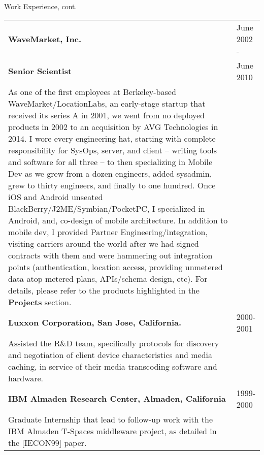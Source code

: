 \newpage
\begin{bf} \large
Work Experience, cont.
\end{bf}
\medskip

\begin{tabular}{p{5.2in}@{\hspace{1.5cm}}l}
	  
	\bf  WaveMarket, Inc.    & June 2002 -  \\
	\bf  Senior Scientist 	& June 2010 \\[4pt]
	
	   As one of the first employees at Berkeley-based WaveMarket/LocationLabs,
	   an early-stage startup that received its series A in 2001, 
	   we went from no deployed products in 2002 to an
	   acquisition by AVG Technologies in 2014.  I wore every engineering hat, starting with complete responsibility
	   for SysOps, server, and client -- writing tools and software for all three -- to
	   then specializing in Mobile Dev as we grew from a dozen engineers, added sysadmin, grew 
	   to thirty engineers, and finally to one hundred.  
	   Once iOS and Android unseated BlackBerry/J2ME/Symbian/PocketPC,
	   I specialized in Android, and, co-design of mobile architecture.  In addition to mobile dev, I provided
	   Partner Engineering/integration, visiting carriers around the world after we had signed contracts
	   with them and were hammering out integration points (authentication, location access, 
	   providing unmetered data atop metered plans, APIs/schema design, etc).
	   For details, please refer to the products highlighted in the {\bf Projects} section. \\[9pt]
       	  
    \bf Luxxon Corporation, San Jose, California. & 2000-2001 \\[3pt]
       Assisted the R\&D team, specifically
       protocols for discovery and negotiation of client
       device characteristics and media caching, in service of their media transcoding
       software and hardware. \\[9pt]

    \bf IBM Almaden Research Center, 
          Almaden, California                         & 1999-2000 \\[3pt]
       Graduate Internship that lead to follow-up work with
       the IBM Almaden T-Spaces middleware project, as detailed in the [IECON99] paper. \\[9pt]


\end{tabular}


